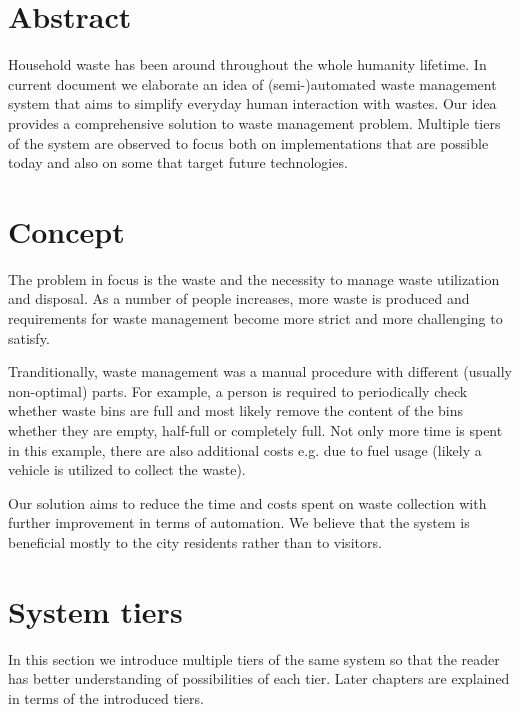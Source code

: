 \documentclass{article}
\title{
Exercise 1: Design for urban IoT. Waste management system
\bigskip
\author{Andrei Golubev 2621924 \\ Hassan Shaheen 2600602}
\date{\parbox{\linewidth}{\centering
  \endgraf\bigskip
  University of Oulu, Oulu, Finland
  \endgraf\monthyeardate\today}}
}
\begin{document}
\maketitle
\thispagestyle{empty}
\newpage

\section{Abstract}
Household waste has been around throughout the whole humanity lifetime. In current document we
elaborate an idea of (semi-)automated waste management system that aims to simplify everyday human
interaction with wastes. Our idea provides a comprehensive solution to waste management problem.
Multiple tiers of the system are observed to focus both on implementations that are possible today
and also on some that target future technologies.

\section{Concept}

The problem in focus is the waste and the necessity to manage waste utilization and disposal. As a
number of people increases, more waste is produced and requirements for waste management become more
strict and more challenging to satisfy.

Tranditionally, waste management was a manual procedure with different (usually non-optimal) parts.
For example, a person is required to periodically check whether waste bins are full and most likely
remove the content of the bins whether they are empty, half-full or completely full. Not only more
time is spent in this example, there are also additional costs e.g. due to fuel usage (likely a
vehicle is utilized to collect the waste).

Our solution aims to reduce the time and costs spent on waste collection with further improvement in
terms of automation. We believe that the system is beneficial mostly to the city residents rather
than to visitors.

\section{System tiers}

In this section we introduce multiple tiers of the same system so that the reader has better
understanding of possibilities of each tier. Later chapters are explained in terms of the introduced
tiers.
\end{document}
